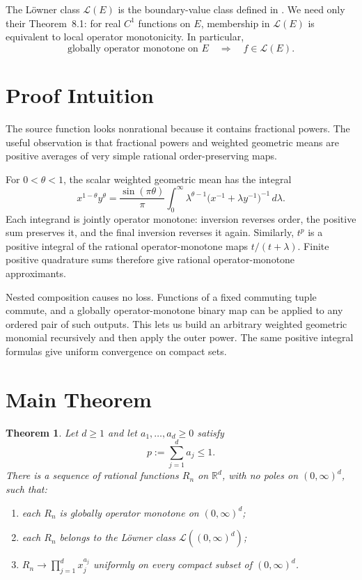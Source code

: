 \documentclass[11pt]{article}
\newtheorem{theorem}{Theorem}
\newcommand{\R}{\mathbb R}
\newcommand{\Loe}{\mathcal L}
\newcommand{\Pos}{(0,\infty)}
\begin{document}
The L\"owner class $\Loe(E)$ is the boundary-value class defined in
\cite{AMY}.  We need only their Theorem~8.1: for real $C^1$ functions on
$E$, membership in $\Loe(E)$ is equivalent to local operator monotonicity.
In particular,
\begin{equation}\label{eq:global-to-loewner}
 \text{globally operator monotone on }E
 \quad\Longrightarrow\quad f\in\Loe(E).
\end{equation}

\section*{Proof Intuition}

The source function looks nonrational because it contains fractional powers.
The useful observation is that fractional powers and weighted geometric means
are positive averages of very simple rational order-preserving maps.

For $0<\theta<1$, the scalar weighted geometric mean has the integral
\[
 x^{1-\theta}y^\theta
 =\frac{\sin(\pi\theta)}{\pi}
   \int_0^\infty \lambda^{\theta-1}
   \bigl(x^{-1}+\lambda y^{-1}\bigr)^{-1}\,d\lambda.
\]
Each integrand is jointly operator monotone: inversion reverses order, the
positive sum preserves it, and the final inversion reverses it again.
Similarly, $t^p$ is a positive integral of the rational operator-monotone
maps $t/(t+\lambda)$.  Finite positive quadrature sums therefore give
rational operator-monotone approximants.

Nested composition causes no loss.  Functions of a fixed commuting tuple
commute, and a globally operator-monotone binary map can be applied to any
ordered pair of such outputs.  This lets us build an arbitrary weighted
geometric monomial recursively and then apply the outer power.  The same
positive integral formulas give uniform convergence on compact sets.

\section*{Main Theorem}

\begin{theorem}\label{thm:main}
Let $d\geq1$ and let $a_1,\ldots,a_d\geq0$ satisfy
\[
                         p:=\sum_{j=1}^d a_j\leq1.
\]
There is a sequence of rational functions $R_n$ on $\R^d$, with no poles on
$\Pos^d$, such that:
\begin{enumerate}
\item each $R_n$ is globally operator monotone on $\Pos^d$;
\item each $R_n$ belongs to the L\"owner class $\Loe(\Pos^d)$;
\item $R_n\to\prod_{j=1}^d x_j^{a_j}$ uniformly on every compact subset of
$\Pos^d$.
\end{enumerate}
\end{theorem}
\end{document}
